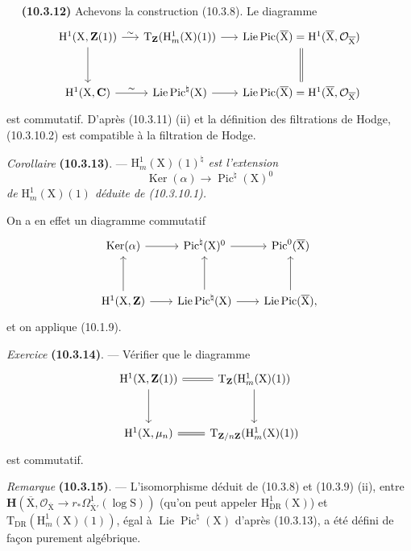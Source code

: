 \documentclass[11pt,leqno]{article}
\newcommand{\Page}[1]{\ifvmode\noindent\else\unskip\ \fi{\footnotesize\textcolor{gray}{[p.\,#1]}}\ \ignorespaces}
\begin{document}
\Page{74}
\textbf{(10.3.12)} Achevons la construction (10.3.8). Le diagramme
\[
\begin{tikzcd}[column sep=1.5em,row sep=3em]
\mathrm{H}^{1}(\mathrm{X},\mathbf{Z}(1))
 \arrow[r,"\sim"] \arrow[d]
&
\mathrm{T}_{\mathbf{Z}}(\mathrm{H}^{1}_{m}(\mathrm{X})(1))
 \arrow[r]
&
\operatorname{Lie}\operatorname{Pic}(\overline{\mathrm{X}})
 =\mathrm{H}^{1}(\overline{\mathrm{X}},\mathcal{O}_{\overline{\mathrm{X}}})
 \arrow[d,equal]
\\
\mathrm{H}^{1}(\mathrm{X},\mathbf{C})
 \arrow[r,"\sim"]
&
\operatorname{Lie}\operatorname{Pic}^{\natural}(\mathrm{X})
 \arrow[r]
&
\operatorname{Lie}\operatorname{Pic}(\overline{\mathrm{X}})
 =\mathrm{H}^{1}(\overline{\mathrm{X}},\mathcal{O}_{\overline{\mathrm{X}}})
\end{tikzcd}
\]
est commutatif. D’après (10.3.11) (ii) et la définition des filtrations de Hodge, (10.3.10.2) est compatible à la filtration de Hodge.

\textit{Corollaire} \textbf{(10.3.13)}. — \textit{\(\mathrm{H}^{1}_{m}(\mathrm{X})(1)^{\natural}\) est l’extension}
\[
\operatorname{Ker}(\alpha)\longrightarrow\operatorname{Pic}^{\natural}(\mathrm{X})^{0}
\]
\textit{de \(\mathrm{H}^{1}_{m}(\mathrm{X})(1)\) déduite de \textup{(10.3.10.1)}.}

On a en effet un diagramme commutatif
\[
\begin{tikzcd}[column sep=2em,row sep=3em]
\operatorname{Ker}(\alpha) \arrow[r]
&
\operatorname{Pic}^{\natural}(\mathrm{X})^{0} \arrow[r]
&
\operatorname{Pic}^{0}(\overline{\mathrm{X}})
\\
\mathrm{H}^{1}(\mathrm{X},\mathbf{Z}) \arrow[r] \arrow[u]
&
\operatorname{Lie}\operatorname{Pic}^{\natural}(\mathrm{X})
 \arrow[r] \arrow[u]
&
\operatorname{Lie}\operatorname{Pic}(\overline{\mathrm{X}}), \arrow[u]
\end{tikzcd}
\]
et on applique (10.1.9).

\textit{Exercice} \textbf{(10.3.14)}. — Vérifier que le diagramme
\[
\begin{tikzcd}[column sep=2em,row sep=3em]
\mathrm{H}^{1}(\mathrm{X},\mathbf{Z}(1))
 \arrow[r,equal] \arrow[d]
&
\mathrm{T}_{\mathbf{Z}}(\mathrm{H}^{1}_{m}(\mathrm{X})(1))
 \arrow[d]
\\
\mathrm{H}^{1}(\mathrm{X},\mu_n) \arrow[r,equal]
&
\mathrm{T}_{\mathbf{Z}/n\mathbf{Z}}(\mathrm{H}^{1}_{m}(\mathrm{X})(1))
\end{tikzcd}
\]
est commutatif.

\textit{Remarque} \textbf{(10.3.15)}. — L’isomorphisme déduit de (10.3.8) et (10.3.9) (ii), entre \(\mathbf{H}(\overline{\mathrm{X}},\mathcal{O}_{\overline{\mathrm{X}}}\to r_*\Omega^{1}_{\overline{\mathrm{X}}'}(\log\mathrm{S}))\) (qu’on peut appeler \(\mathrm{H}^{1}_{\mathrm{DR}}(\mathrm{X})\)) et \(\mathrm{T}_{\mathrm{DR}}(\mathrm{H}^{1}_{m}(\mathrm{X})(1))\), égal à \(\operatorname{Lie}\operatorname{Pic}^{\natural}(\mathrm{X})\) d’après (10.3.13), a été défini de façon purement algébrique.
\end{document}
